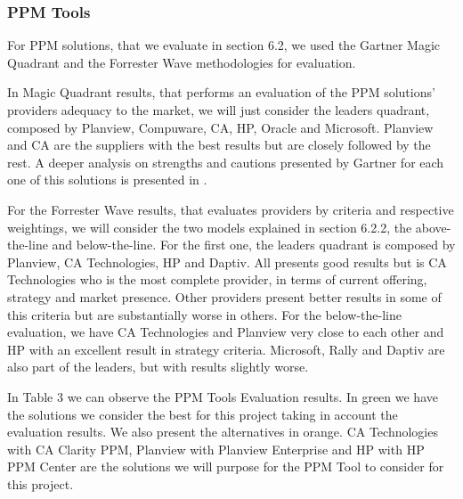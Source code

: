 \subsubsection{PPM Tools}

For PPM solutions, that we evaluate in section 6.2, we used the Gartner Magic Quadrant and the Forrester Wave methodologies for evaluation.\par
In Magic Quadrant results, that performs an evaluation of the PPM solutions' providers adequacy to the market, we will just consider the leaders quadrant, composed by Planview, Compuware, CA, HP, Oracle and Microsoft. Planview and CA are the suppliers with the best results but are closely followed by the rest. A deeper analysis on strengths and cautions presented by Gartner for each one of this solutions is presented in \cite{magicQuadrantPPM}.\par
For the Forrester Wave results, that evaluates providers by criteria and respective weightings, we will consider the two models explained in section 6.2.2, the above-the-line and below-the-line. For the first one, the leaders quadrant is composed by Planview, CA Technologies, HP and Daptiv. All presents good results but is CA Technologies who is the most complete provider, in terms of current offering, strategy and market presence. Other providers present better results in some of this criteria but are substantially worse in others. For the below-the-line evaluation, we have CA Technologies and Planview very close to each other and HP with an excellent result in strategy criteria. Microsoft, Rally and Daptiv are also part of the leaders, but with results slightly worse.\par
In Table 3 we can observe the PPM Tools Evaluation results. In green we have the solutions we consider the best for this project taking in account the evaluation results. We also present the alternatives in orange. CA Technologies with CA Clarity PPM, Planview with Planview Enterprise and HP with HP PPM Center are the solutions we will purpose for the PPM Tool to consider for this project.


